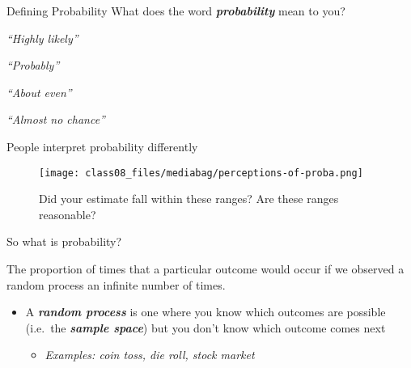 \documentclass[
  ignorenonframetext,
]{beamer}
\providecommand{\tightlist}{%
  \setlength{\itemsep}{0pt}\setlength{\parskip}{0pt}}\usepackage{longtable,booktabs,array}
\begin{document}
\begin{frame}{Defining Probability}
\label{defining-probability}
What does the word \textbf{\emph{probability}} mean to you?

\pause

\emph{``Highly likely''}

\pause

\emph{``Probably''}

\pause

\emph{``About even''}

\pause

\emph{``Almost no chance''}
\end{frame}

\begin{frame}{People interpret probability differently}
\label{people-interpret-probability-differently}
\begin{figure}[H]

{\centering \texttt{[image: class08\_files/mediabag/perceptions-of-proba.png]}

}

\caption{Did your estimate fall within these ranges? Are these ranges
reasonable?}

\end{figure}%
\end{frame}

\begin{frame}{So what is probability?}
\label{so-what-is-probability}
\begin{tcolorbox}[enhanced jigsaw, colframe=quarto-callout-important-color-frame, coltitle=black, opacitybacktitle=0.6, toptitle=1mm, colbacktitle=quarto-callout-important-color!10!white, bottomrule=.15mm, left=2mm, leftrule=.75mm, rightrule=.15mm, title=\textcolor{quarto-callout-important-color}{\faExclamation}\hspace{0.5em}{Frequentist Definition}, breakable, opacityback=0, colback=white, arc=.35mm, titlerule=0mm, bottomtitle=1mm, toprule=.15mm]

The proportion of times that a particular outcome would occur if we
observed a random process an infinite number of times.

\end{tcolorbox}

\begin{itemize}
\item
  A \textbf{\emph{random process}} is one where you know which outcomes
  are possible (i.e.~the \textbf{\emph{sample space}}) but you don't
  know which outcome comes next

  \begin{itemize}
  \tightlist
  \item
    \emph{Examples: coin toss, die roll, stock market}
  \end{itemize}
\end{itemize}
\end{frame}
\end{document}
